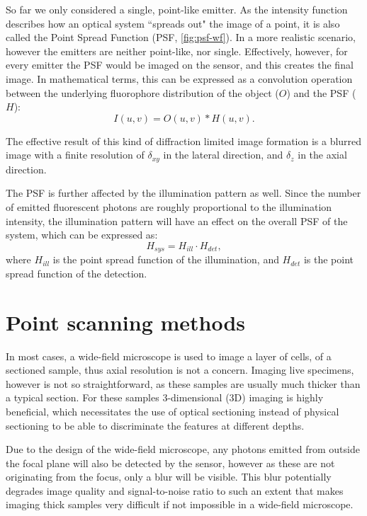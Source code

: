    So far we only considered a single, point-like emitter. As the intensity function describes how an optical system ``spreads out" the image of a point, it is also called the Point Spread Function (PSF, \autoref{fig:psf-wf}). In a more realistic scenario, however the emitters are neither point-like, nor single. Effectively, however, for every emitter the PSF would be imaged on the sensor, and this creates the final image. In mathematical terms, this can be expressed as a convolution operation between the underlying fluorophore distribution of the object ($O$) and the PSF ($H$):
    \begin{equation}
      I(u,v) = O(u,v) * H(u,v).
    \end{equation}

    The effective result of this kind of diffraction limited image formation is a blurred image with a finite resolution of $\delta_{xy}$ in the lateral direction, and $\delta_z$ in the axial direction.

    The PSF is further affected by the illumination pattern as well. Since the number of emitted fluorescent photons are roughly proportional to the illumination intensity, the illumination pattern will have an effect on the overall PSF of the system, which can be expressed as:
    \begin{equation}
      H_{sys} = H_{ill} \cdot H_{det},
      \label{eq:systemPSF}
    \end{equation}
    where $H_{ill}$ is the point spread function of the illumination, and $H_{det}$ is the point spread function of the detection.



\section{Point scanning methods}
  In most cases, a wide-field microscope is used to image a layer of cells, of a sectioned sample, thus axial resolution is not a concern. Imaging live specimens, however is not so straightforward, as these samples are usually much thicker than a typical section. For these samples 3-dimensional (3D) imaging is highly beneficial, which necessitates the use of optical sectioning instead of physical sectioning to be able to discriminate the features at different depths.


  Due to the design of the wide-field microscope, any photons emitted from outside the focal plane will also be detected by the sensor, however as these are not originating from the focus, only a blur will be visible. This blur potentially degrades image quality and signal-to-noise ratio to such an extent that makes imaging thick samples very difficult if not impossible in a wide-field microscope. 

